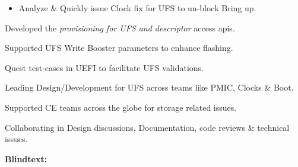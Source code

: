 \documentclass[a4paper]{chirri} %
\begin{document}
\begin{tcolorbox}
\begin{itemize}
{\begin{itemize}
      \item \noindent Analyze \& Quickly issue Clock fix for UFS to un-block Bring up.
      \end{itemize}
%
      \item \noindent Developed the \textit{provisioning for UFS and descriptor} access apis.
      \item \noindent Supported UFS Write Booster parameters to enhance flashing.
      \item \noindent Quest test-cases in UEFI to facilitate UFS validations.
      \item \noindent Leading Design/Development for UFS across teams like PMIC, Clocks \& Boot.
      \item \noindent Supported CE teams across the globe for storage related issues.
      \item \noindent Collaborating in Design discussions, Documentation, code reviews \& technical issues.
}
\end{itemize}
\end{tcolorbox}

\lipsum[1-3]
\textbf{Blindtext:}
\Blindtext
\end{document}
